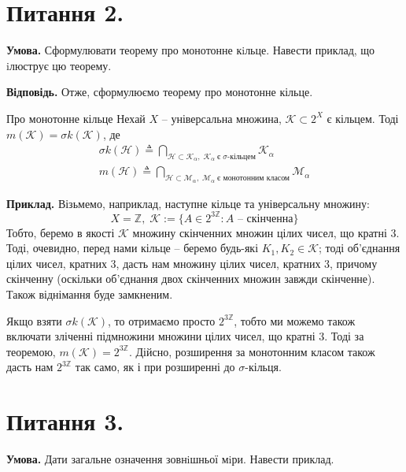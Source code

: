 \documentclass[14pt]{extarticle}
\begin{document}
\section*{Питання 2.}

\textbf{Умова.} Сформулювати теорему про монотонне кiльце. Навести приклад, що iлюструє цю теорему.

\textbf{Відповідь.} Отже, сформулюємо теорему про монотонне кільце.

\begin{theorem*}{Про монотонне кільце}
    Нехай $X$ -- універсальна множина, $\mathcal{K} \subset 2^X$ є кільцем. Тоді $m(\mathcal{K}) = \sigma k(\mathcal{K})$, де
    \begin{gather*}
    \sigma k(\mathcal{H}) \triangleq \bigcap_{\mathcal{H} \subset \mathcal{K}_{\alpha},\;\mathcal{K}_{\alpha} \; \text{є $\sigma$-кільцем}} \mathcal{K}_{\alpha} \\
    m(\mathcal{H}) \triangleq \bigcap_{\mathcal{H} \subset \mathcal{M}_{\alpha},\;\mathcal{M}_{\alpha} \; \text{є монотонним класом}} \mathcal{M}_{\alpha}
    \end{gather*}
\end{theorem*}

\textbf{Приклад.} Візьмемо, наприклад, наступне кільце та універсальну множину:
\[
X = \mathbb{Z}, \; \mathcal{K} := \{A \in 2^{3\mathbb{Z}}: \text{$A$ -- скінченна}\}
\]
Тобто, беремо в якості $\mathcal{K}$ множину скінченних множин цілих чисел, що кратні $3$. Тоді, очевидно, перед нами кільце -- беремо будь-які $K_1,K_2 \in \mathcal{K}$; тоді об'єднання цілих чисел, кратних 3, дасть нам множину цілих чисел, кратних 3, причому скінченну (оскільки об'єднання двох скінченних множин завжди скінченне). Також віднімання буде замкненим.

Якщо взяти $\sigma k(\mathcal{K})$, то отримаємо просто $2^{3\mathbb{Z}}$, тобто ми можемо також включати зліченні підмножини множини цілих чисел, що кратні 3. Тоді за теоремою, $m(\mathcal{K})=2^{3\mathbb{Z}}$. Дійсно, розширення за монотонним класом також дасть нам $2^{3\mathbb{Z}}$ так само, як і при розширенні до $\sigma$-кільця. 


\pagebreak
\section*{Питання 3.}

\textbf{Умова.} Дати загальне означення зовнiшньої мiри. Навести приклад.
\end{document}
